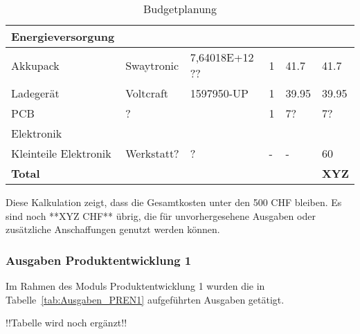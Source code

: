 \documentclass[main.tex]{subfiles} %
\begin{document}
\begin{table}[h]
\begin{tabular}{|p{3cm}|p{3cm}|p{3cm}|p{1cm}|p{1.5cm}|p{1cm}|}
        \rowcolor{lightgray} Energieversorgung &                        &                                 &                     &                            &                                 \\ \hline
        Akkupack                               & Swaytronic             & 7,64018E+12 ??                  & 1                   & 41.7                       & 41.7                            \\ \hline
        Ladegerät                              & Voltcraft              & 1597950-UP                      & 1                   & 39.95                      & 39.95                           \\ \hline
        PCB                                    & ?                      &                                 & 1                   & 7?                         & 7?                              \\ \hline
        \rowcolor{lightgray} Elektronik        &                        &                                 &                     &                            &                                 \\ \hline
        Kleinteile Elektronik                  & Werkstatt?             & ?                               & -                   & -                          & 60                              \\ \hline
        \textbf{Total}                         &                        &                                 &                     &                            & \textbf{XYZ}                   \\ \hline
    \end{tabular}
    \caption{Budgetplanung}
    \label{tab:Budgetplanung}
\end{table}

Diese Kalkulation zeigt, dass die Gesamtkosten unter den 500 CHF bleiben. Es sind noch **XYZ CHF** übrig, 
    die für unvorhergesehene Ausgaben oder zusätzliche Anschaffungen genutzt werden können.






\subsubsection{Ausgaben Produktentwicklung 1}
Im Rahmen des Moduls Produktentwicklung 1 wurden die in Tabelle~\ref{tab:Ausgaben_PREN1} aufgeführten 
Ausgaben getätigt. 


!!Tabelle wird noch ergänzt!!
\end{document}
